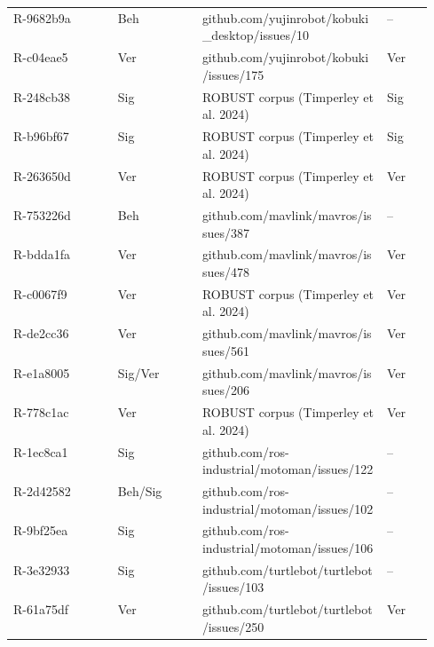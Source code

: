 \begin{longtable}{@{}ll>{\raggedright\arraybackslash}p{0.44\linewidth}>{\raggedright\arraybackslash}p{0.11\linewidth}@{}}
R-9682b9a & Beh & {\scriptsize\ttfamily github.com/\allowbreak{}yujinrobot/\allowbreak{}kobuki\_desktop/\allowbreak{}issues/\allowbreak{}10} & -- \\
R-c04eae5 & Ver & {\scriptsize\ttfamily github.com/\allowbreak{}yujinrobot/\allowbreak{}kobuki/\allowbreak{}issues/\allowbreak{}175} & Ver \\
R-248cb38 & Sig & {\scriptsize ROBUST corpus (Timperley et al. 2024)} & Sig \\
R-b96bf67 & Sig & {\scriptsize ROBUST corpus (Timperley et al. 2024)} & Sig \\
R-263650d & Ver & {\scriptsize ROBUST corpus (Timperley et al. 2024)} & Ver \\
R-753226d & Beh & {\scriptsize\ttfamily github.com/\allowbreak{}mavlink/\allowbreak{}mavros/\allowbreak{}issues/\allowbreak{}387} & -- \\
R-bdda1fa & Ver & {\scriptsize\ttfamily github.com/\allowbreak{}mavlink/\allowbreak{}mavros/\allowbreak{}issues/\allowbreak{}478} & Ver \\
R-c0067f9 & Ver & {\scriptsize ROBUST corpus (Timperley et al. 2024)} & Ver \\
R-de2cc36 & Ver & {\scriptsize\ttfamily github.com/\allowbreak{}mavlink/\allowbreak{}mavros/\allowbreak{}issues/\allowbreak{}561} & Ver \\
R-e1a8005 & Sig/Ver & {\scriptsize\ttfamily github.com/\allowbreak{}mavlink/\allowbreak{}mavros/\allowbreak{}issues/\allowbreak{}206} & Ver \\
R-778c1ac & Ver & {\scriptsize ROBUST corpus (Timperley et al. 2024)} & Ver \\
R-1ec8ca1 & Sig & {\scriptsize\ttfamily github.com/\allowbreak{}ros-industrial/\allowbreak{}motoman/\allowbreak{}issues/\allowbreak{}122} & -- \\
R-2d42582 & Beh/Sig & {\scriptsize\ttfamily github.com/\allowbreak{}ros-industrial/\allowbreak{}motoman/\allowbreak{}issues/\allowbreak{}102} & -- \\
R-9bf25ea & Sig & {\scriptsize\ttfamily github.com/\allowbreak{}ros-industrial/\allowbreak{}motoman/\allowbreak{}issues/\allowbreak{}106} & -- \\
R-3e32933 & Sig & {\scriptsize\ttfamily github.com/\allowbreak{}turtlebot/\allowbreak{}turtlebot/\allowbreak{}issues/\allowbreak{}103} & -- \\
R-61a75df & Ver & {\scriptsize\ttfamily github.com/\allowbreak{}turtlebot/\allowbreak{}turtlebot/\allowbreak{}issues/\allowbreak{}250} & Ver \\

\end{longtable}
